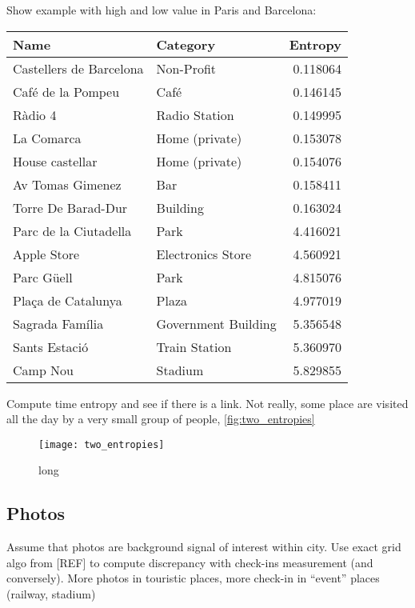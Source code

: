 Show example with high and low value in Paris and Barcelona:
\begin{tabular}{llr}
	\toprule
	Name                    & Category            & Entropy \\
	\midrule
	Castellers de Barcelona & Non-Profit          & 0.118064 \\
	Café de la Pompeu       & Café                & 0.146145 \\
	Ràdio 4                 & Radio Station       & 0.149995 \\
	La Comarca              & Home (private)      & 0.153078 \\
	House castellar         & Home (private)      & 0.154076 \\
	Av Tomas Gimenez        & Bar                 & 0.158411 \\
	Torre De Barad-Dur      & Building            & 0.163024 \\
	\midrule
	Parc de la Ciutadella   & Park                & 4.416021 \\
	Apple Store             & Electronics Store   & 4.560921 \\
	Parc Güell              & Park                & 4.815076 \\
	Plaça de Catalunya      & Plaza               & 4.977019 \\
	Sagrada Família         & Government Building & 5.356548 \\
	Sants Estació           & Train Station       & 5.360970 \\
	Camp Nou                & Stadium             & 5.829855 \\
	\bottomrule
\end{tabular}

Compute time entropy and see if there is a link. Not really, some place are
visited all the day by a very small group of people,
\autoref{fig:two_entropies}

\begin{figure}[hbtp]
\texttt{[image: two\_entropies]}
\caption[short]{long}
\label{fig:two_entropies}
\end{figure}


\subsection{Photos}

Assume that photos are background signal of interest within city. Use exact
grid algo from [REF] to compute discrepancy with check-ins measurement (and
conversely).  More photos in touristic places,
more check-in in “event” places (railway, stadium)

